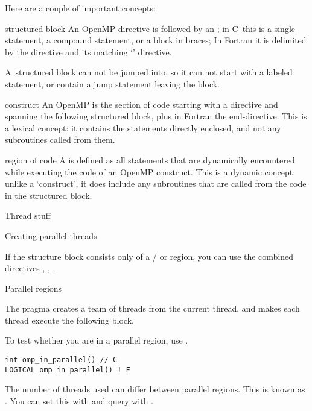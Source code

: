 Here are a couple of important concepts:
\begin{definition}
\item[structured block] An OpenMP directive is followed by an
  ; in C~this is a single statement, a
  compound statement, or a block in braces; In Fortran it is
  delimited by the directive and its matching `' directive.

  A~structured block can not be jumped into, so it can not start with a
  labeled statement, or contain a jump statement leaving the block.
\item[construct] An OpenMP  is the section of code
  starting with a directive and spanning the following structured block,
  plus in Fortran the end-directive. This is a lexical concept: it contains
  the statements directly enclosed, and not any subroutines called from them.
\item[region of code] A  is defined as all statements
  that are dynamically encountered while executing the code of an OpenMP construct.
  This is a dynamic concept: unlike a `construct', it does include any subroutines
  that are called from the code in the structured block.
\end{definition}

 {Thread stuff}

 {Creating parallel threads}


If the structure block consists only of a / or  region,
you can use the combined directives
,
,
.

 {Parallel regions}

The  pragma creates a team of threads from the current thread,
and makes each thread execute the following block.

To test whether you are in a parallel region, use
.
\begin{verbatim}
int omp_in_parallel() // C
LOGICAL omp_in_parallel() ! F
\end{verbatim}

The number of threads used can differ between parallel regions. This is known
as . You can set this with
 and query with
.

